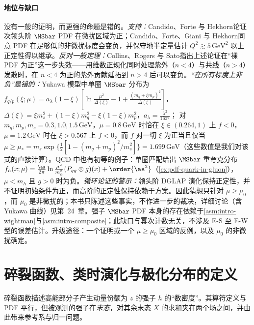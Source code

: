 \paragraph{地位与缺口}
没有一般的证明，而更强的命题是错的。\emph{支持：}Candido、Forte 与 Hekhorn\cite{CandidoForteHekhorn2020}论证次领头阶 $\MSbar$ PDF 在微扰区域为正；Candido、Forte、Giani 与 Hekhorn\cite{Candido:2023ujx}同意 PDF 在足够低的非微扰标度会变负，并保守地半定量估计 $Q^2\gtrsim5\,\mathrm{GeV}^2$ 以上正定性得以继承。\emph{反对一般定理：}Collins、Rogers 与 Sato\cite[第~VI~节]{CollinsRogersSato2022}指出上述论证在“裸 PDF 为正”这一步失效——用维数正规化同时处理紫外（$n<4$）与共线（$n>4$）发散时，在 $n<4$ 为正的紫外贡献延拓到 $n>4$ 后可以变负。\emph{“在所有标度上非负”是错的：}Yukawa 模型中单圈 $\MSbar$ 分布为 $f_{q/p}(\xi;\mu)=a_\lambda(1-\xi)[\ln\frac{\mu^2}{\Delta(\xi)}-1+\frac{(m_q+\xi m_p)^2}{\Delta(\xi)}]$，$\Delta(\xi)=\xi m_s^2+(1-\xi)m_q^2-\xi(1-\xi)m_p^2$，$a_\lambda=\frac{\lambda^2}{16\pi^2}$\cite[式~(55)]{CollinsRogersSato2022}；
对 $m_q,m_p,m_s=0.3,1.0,1.5\,\mathrm{GeV}$，$\mu=0.8\,\mathrm{GeV}$ 时恰在 $\xi\in(0.264,1)$ 上 $f<0$，$\mu=1.2\,\mathrm{GeV}$ 时在 $\xi>0.567$ 上 $f<0$，而 $f$ 对一切 $\xi$ 为正当且仅当 $\mu\ge\mu_*=m_s\exp\{\frac12[1-(m_q+m_p)^2/m_s^2]\}=1.699\,\mathrm{GeV}$（这些数值是我们对该式的直接计算）。QCD 中也有初等的例子：单圈匹配给出 $\MSbar$ 重夸克分布 $f_h(x;\mu)=\frac{\as}{2\pi}\ln\frac{\mu^2}{m_h^2}(P_{qg}\otimes g)(x)+\order{\as^2}$（\cref{ex:pdf-quark-in-gluon}），$\mu<m_h$ 且 $g>0$ 时为负。\emph{循环论证的警示：}领头阶 DGLAP 演化保持正定性，并不证明初始条件为正，而高阶的正定性保持依赖于方案。因此猜想只针对 $\mu\ge\mu_0$，而 $\mu_0$ 是非微扰的；本书只陈述这些事实，不作进一步的裁决，详细讨论（含 Yukawa 曲线）见第~24~章。强子 $\MSbar$ PDF 本身的存在依赖于\cref{asm:intro-wightman}与\cref{asm:intro-composite}；此缺口与幂次计数无关，不涉及 E-S 至 E-W 型的误差估计。升级途径：一个证明或一个 $\mu\ge\mu_0$ 区域的反例，以及 $\mu_0$ 的非微扰确定。

\section{碎裂函数、类时演化与极化分布的定义}\label{sec:pdf-ff}

碎裂函数描述高能部分子产生动量份额为 $z$ 的强子 $h$ 的“数密度”。其算符定义与 PDF 平行，但被观测的强子在\emph{末态}，对其余末态 $X$ 的求和夹在两个场之间，并由此带来参考系与归一问题。

